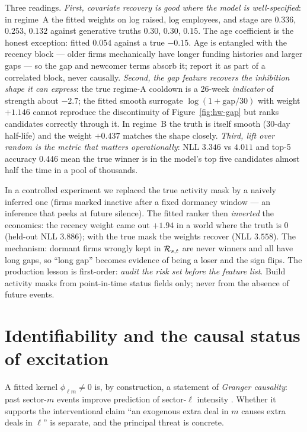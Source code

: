 Three readings. \emph{First, covariate recovery is good where the model is
well-specified}: in regime~A the fitted weights on log raised, log employees, and stage
are $0.336$, $0.253$, $0.132$ against generative truths $0.30$, $0.30$, $0.15$. The age
coefficient is the honest exception: fitted $0.054$ against a true $-0.15$. Age is
entangled with the recency block --- older firms mechanically have longer funding
histories and larger gaps --- so the gap and newcomer terms absorb it; report it as part
of a correlated block, never causally.
\emph{Second, the gap feature recovers the inhibition shape it can express}: the true
regime-A cooldown is a 26-week \emph{indicator} of strength about $-2.7$; the fitted
smooth surrogate $\log(1+\mathrm{gap}/30)$ with weight $+1.146$ cannot reproduce the
discontinuity of Figure~\ref{fig:hw-gap} but ranks candidates correctly through it. In
regime~B the truth is itself smooth (30-day half-life) and the weight $+0.437$ matches
the shape closely. \emph{Third, lift over random is the metric that matters
operationally}: NLL $3.346$ vs $4.011$ and top-5 accuracy $0.446$ mean the true winner is
in the model's top five candidates almost half the time in a pool of thousands.

\begin{warning}
\label{warn:hw-riskset}
In a controlled experiment we replaced the true activity mask by a naively inferred one
(firms marked inactive after a fixed dormancy window --- an inference that peeks at future
silence). The fitted ranker then \emph{inverted} the economics: the recency weight came
out $+1.94$ in a world where the truth is $0$ (held-out NLL $3.886$); with the true mask
the weights recover (NLL $3.558$). The mechanism: dormant firms wrongly kept in
$\mathcal{R}_{s,t}$ are never winners and all have long gaps, so ``long gap'' becomes evidence of
being a loser and the sign flips. The production lesson is first-order: \emph{audit the
risk set before the feature list}. Build activity masks from point-in-time status fields
only; never from the absence of future events.
\end{warning}

\section{Identifiability and the causal status of excitation}
\label{sec:hw-ident}

A fitted kernel $\phi_{\ell m} \ne 0$ is, by construction, a statement of \emph{Granger
causality}: past sector-$m$ events improve prediction of sector-$\ell$ intensity
\cite{bacry2015}. Whether it supports the interventional claim ``an exogenous extra deal
in $m$ causes extra deals in $\ell$'' is separate, and the principal threat is concrete.

